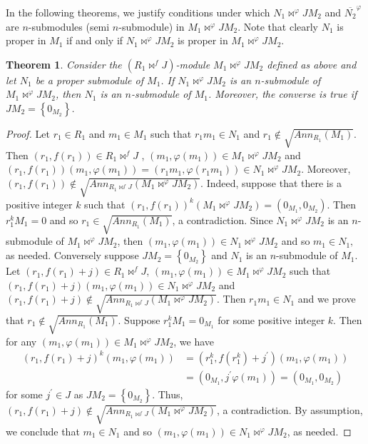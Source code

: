 \documentclass{amsart}%
\newtheorem{theorem}{Theorem}
\theoremstyle{plain}
\numberwithin{equation}{section}
\begin{document}
In the following theorems, we justify conditions under which $N_{1}%
\Join^{\varphi}JM_{2}$ and $\overline{N_{2}}^{\varphi}$ are $n$-submodules
(semi $n$-submodule) in $M_{1}\Join^{\varphi}JM_{2}$. Note that clearly
$N_{1}$ is proper in $M_{1}$ if and only if $N_{1}\Join^{\varphi}JM_{2}$ is
proper in $M_{1}\Join^{\varphi}JM_{2}$.

\begin{theorem}
\label{Amalg}Consider the $(R_{1}\Join^{f}J)$-module $M_{1}\Join^{\varphi
}JM_{2}$ defined as above and let $N_{1}$ be a proper submodule of $M_{1}$. If
$N_{1}\Join^{\varphi}JM_{2}$ is an $n$-submodule of $M_{1}\Join^{\varphi
}JM_{2}$, then $N_{1}$ is an $n$-submodule of $M_{1}$. Moreover, the converse
is true if $JM_{2}=\left\{  0_{M_{2}}\right\}  $.
\end{theorem}

\begin{proof}
Let $r_{1}\in R_{1}$ and $m_{1}\in M_{1}$ such that $r_{1}m_{1}\in N_{1}$ and
$r_{1}\notin\sqrt{Ann_{R_{1}}(M_{1})}$. Then $(r_{1},f(r_{1}))\in R_{1}%
\Join^{f}J$ , $(m_{1},\varphi(m_{1}))\in M_{1}\Join^{\varphi}JM_{2}$ and
$(r_{1},f(r_{1}))(m_{1},\varphi(m_{1}))=(r_{1}m_{1},\varphi(r_{1}m_{1}))\in
N_{1}\Join^{\varphi}JM_{2}$. Moreover, $(r_{1},f(r_{1}))\notin\sqrt
{Ann_{R_{1}\Join^{f}J}(M_{1}\Join^{\varphi}JM_{2})}$. Indeed, suppose that
there is a positive integer $k$ such that $(r_{1},f(r_{1}))^{k}(M_{1}%
\Join^{\varphi}JM_{2})=(0_{M_{1}},0_{M_{2}})$. Then $r_{1}^{k}M_{1}=0$ and so
$r_{1}\in\sqrt{Ann_{R_{1}}(M_{1})}$, a contradiction. Since $N_{1}%
\Join^{\varphi}JM_{2}$ is an $n$-submodule of $M_{1}\Join^{\varphi}JM_{2}$,
then $(m_{1},\varphi(m_{1}))\in N_{1}\Join^{\varphi}JM_{2}$ and so $m_{1}\in
N_{1},$ as needed. Conversely suppose $JM_{2}=\left\{  0_{M_{2}}\right\}  $
and $N_{1}$ is an $n$-submodule of $M_{1}$. Let $(r_{1},f(r_{1})+j)\in
R_{1}\Join^{f}J$, $(m_{1},\varphi(m_{1}))\in M_{1}\Join^{\varphi}JM_{2}$ such
that $(r_{1},f(r_{1})+j)(m_{1},\varphi(m_{1}))\in N_{1}\Join^{\varphi}JM_{2}$
and $(r_{1},f(r_{1})+j)\notin\sqrt{Ann_{R_{1}\Join^{f}J}(M_{1}\Join^{\varphi
}JM_{2})}$. Then $r_{1}m_{1}\in N_{1}$ and we prove that $r_{1}\notin
\sqrt{Ann_{R_{1}}(M_{1})}$. Suppose $r_{1}^{k}M_{1}=0_{M_{1}}$ for some
positive integer $k$. Then for any $(m_{1},\varphi(m_{1}))\in M_{1}%
\Join^{\varphi}JM_{2}$, we have
\begin{align*}
(r_{1},f(r_{1})+j)^{k}(m_{1},\varphi(m_{1}))  &  =(r_{1}^{k},f(r_{1}%
^{k})+j^{\prime})(m_{1},\varphi(m_{1}))\\
&  =(0_{M_{1}},j^{\prime}\varphi(m_{1}))=(0_{M_{1}},0_{M_{2}})
\end{align*}
for some $j^{\prime}\in J$ as $JM_{2}=\left\{  0_{M_{2}}\right\}  $. Thus,
$(r_{1},f(r_{1})+j)\notin\sqrt{Ann_{R_{1}\Join^{f}J}(M_{1}\Join^{\varphi
}JM_{2})}$, a contradiction. By assumption, we conclude that $m_{1}\in N_{1}$
and so $(m_{1},\varphi(m_{1}))\in N_{1}\Join^{\varphi}JM_{2}$, as needed.
\end{proof}
\end{document}
